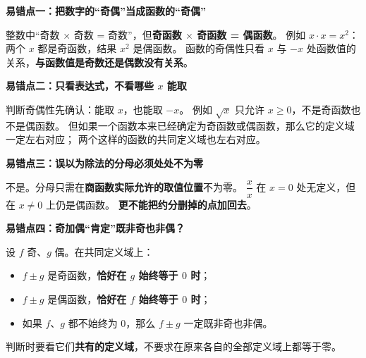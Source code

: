 \clearpage
\begin{trapbox}
\textbf{\textcolor{CTrap}{易错点一：把数字的“奇偶”当成函数的“奇偶”}}



整数中“奇数 $\times$ 奇数 = 奇数”，但\textbf{奇函数 $\times$ 奇函数 = 偶函数}。
例如 $x\cdot x=x^2$：两个 $x$ 都是奇函数，结果 $x^2$ 是偶函数。
函数的奇偶性只看 $x$ 与 $-x$ 处函数值的关系，\textbf{与函数值是奇数还是偶数没有关系}。

\medskip

\end{trapbox}
\clearpage
\begin{trapbox}
\textbf{\textcolor{CTrap}{易错点二：只看表达式，不看哪些 $x$ 能取}}



判断奇偶性先确认：能取 $x$，也能取 $-x$。
例如 $\sqrt{x}$ 只允许 $x\ge0$，不是奇函数也不是偶函数。
但如果一个函数本来已经确定为奇函数或偶函数，那么它的定义域一定左右对应；
两个这样的函数的共同定义域也左右对应。

\medskip

\end{trapbox}
\clearpage
\begin{trapbox}
\textbf{\textcolor{CTrap}{易错点三：误以为除法的分母必须处处不为零}}



不是。分母只需在\textbf{商函数实际允许的取值位置}不为零。
$\dfrac{x}{x}$ 在 $x=0$ 处无定义，但在 $x\ne0$ 上仍是偶函数。
\textbf{更不能把约分删掉的点加回去}。

\medskip

\end{trapbox}
\clearpage
\begin{trapbox}
\textbf{\textcolor{CTrap}{易错点四：奇加偶“肯定”既非奇也非偶？}}



设 $f$ 奇、$g$ 偶。在共同定义域上：
\begin{itemize}[leftmargin=*,itemsep=0.3em,topsep=0.3em]
\item $f\pm g$ 是奇函数，\textbf{恰好在 $g$ 始终等于 $0$ 时}；
\item $f\pm g$ 是偶函数，\textbf{恰好在 $f$ 始终等于 $0$ 时}；
\item 如果 $f$、$g$ 都不始终为 $0$，那么 $f\pm g$ 一定既非奇也非偶。
\end{itemize}
判断时要看它们\textbf{共有的定义域}，不要求在原来各自的全部定义域上都等于零。

\medskip

\end{trapbox}
